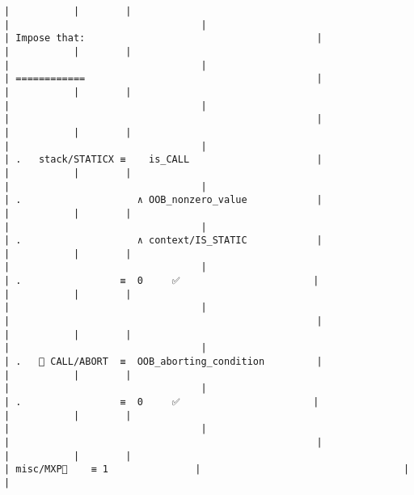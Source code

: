 \documentclass[varwidth=\maxdimen,margin=0.5cm,multi={verbatim}]{standalone}
\begin{document}
\begin{verbatim}
|           |        |                                                                     |                                 |                                   | Impose that:                                        |
|           |        |                                                                     |                                 |                                   | ============                                        |
|           |        |                                                                     |                                 |                                   |                                                     |
|           |        |                                                                     |                                 |                                   | .   stack/STATICX ≡    is_CALL                      |
|           |        |                                                                     |                                 |                                   | .                    ∧ OOB_nonzero_value            |
|           |        |                                                                     |                                 |                                   | .                    ∧ context/IS_STATIC            |
|           |        |                                                                     |                                 |                                   | .                 ≡  0     ✅                       |
|           |        |                                                                     |                                 |                                   |                                                     |
|           |        |                                                                     |                                 |                                   | .    CALL/ABORT  ≡  OOB_aborting_condition         |
|           |        |                                                                     |                                 |                                   | .                 ≡  0     ✅                       |
|           |        |                                                                     |                                 |                                   |                                                     |
|           |        |                                                                     | misc/MXP🚩    ≡ 1               |                                   |                                                     |

\end{verbatim}
\end{document}
